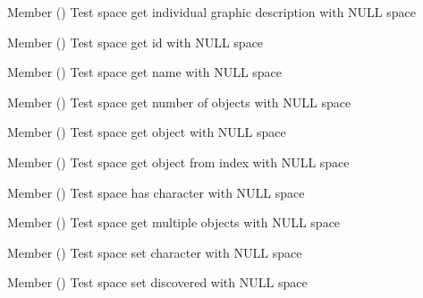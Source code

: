 \begin{DoxyRefList}
\item[Member \doxylink{space__test_8c_a4f9ada1e7b9847c4c2ecab52f92c7f72}{test2\+\_\+space\+\_\+get\+\_\+i\+\_\+description} ()]\label{test__test000149}%
%
Test space get individual graphic description with NULL space  
\item[Member \doxylink{space__test_8c_af9087176b0d3c41d83a17a4918b13e31}{test2\+\_\+space\+\_\+get\+\_\+id} ()]\label{test__test000122}%
%
Test space get id with NULL space  
\item[Member \doxylink{space__test_8c_aee88ed31c63efc674051a4563aed86e2}{test2\+\_\+space\+\_\+get\+\_\+name} ()]\label{test__test000124}%
%
Test space get name with NULL space  
\item[Member \doxylink{space__test_8c_a0b036973034eb7e3ff71ad43dcdea0a3}{test2\+\_\+space\+\_\+get\+\_\+num\+\_\+objects} ()]\label{test__test000141}%
%
Test space get number of objects with NULL space  
\item[Member \doxylink{space__test_8h_a0fe857c34f691aaba197d03315c3955f}{test2\+\_\+space\+\_\+get\+\_\+object} ()]\label{test__test000126}%
%
Test space get object with NULL space  
\item[Member \doxylink{space__test_8c_a68376dad775343380755a49fc53bc8ad}{test2\+\_\+space\+\_\+get\+\_\+object\+\_\+from\+\_\+index} ()]\label{test__test000139}%
%
Test space get object from index with NULL space  
\item[Member \doxylink{space__test_8c_a1cbe7dcf6e64da12172acc79abbd3f65}{test2\+\_\+space\+\_\+has\+\_\+character} ()]\label{test__test000147}%
%
Test space has character with NULL space  
\item[Member \doxylink{space__test_8c_a4c5deb606df6b7b0bd886069628a35e4}{test2\+\_\+space\+\_\+multiple\+\_\+objects} ()]\label{test__test000128}%
%
Test space get multiple objects with NULL space  
\item[Member \doxylink{space__test_8c_a8e7d3726a7551c0de5825cc882836a71}{test2\+\_\+space\+\_\+set\+\_\+character} ()]\label{test__test000145}%
%
Test space set character with NULL space  
\item[Member \doxylink{space__test_8c_a997b53a481b02485dd54c9cbce83465a}{test2\+\_\+space\+\_\+set\+\_\+discovered} ()]\label{test__test000133}%
%
Test space set discovered with NULL space  

\end{DoxyRefList}
